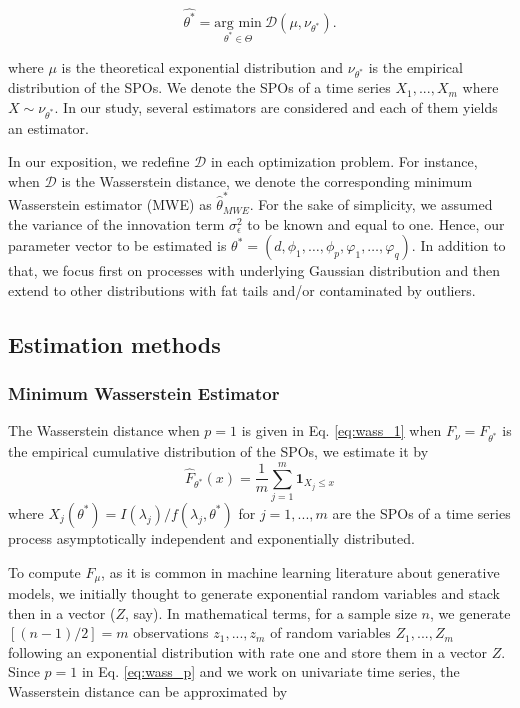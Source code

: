 \documentclass[
  11pt,
]{article}
\begin{document}
\[\hat{\theta^*}=\underset{\theta^* \in \Theta}{\text{arg min}} \ \mathcal{D}\left({\mu}, \nu_{\theta^*}\right) .\]

where \(\mu\) is the theoretical exponential distribution and
\(\nu_{\theta^*}\) is the empirical distribution of the SPOs. We denote
the SPOs of a time series \(X_1, ..., X_m\) where
\(X \sim \nu_{\theta^*}\). In our study, several estimators are
considered and each of them yields an estimator.

In our exposition, we redefine \(\mathcal{D}\) in each optimization
problem. For instance, when \(\mathcal{D}\) is the Wasserstein distance,
we denote the corresponding minimum Wasserstein estimator (MWE) as
\(\hat \theta^*_{MWE}\). For the sake of simplicity, we assumed the
variance of the innovation term \(\sigma^2_\epsilon\) to be known and
equal to one. Hence, our parameter vector to be estimated is
\(\theta^* = (d, \phi_{1}, \ldots, \phi_{p}, \varphi_{1}, \ldots, \varphi_{q}).\)
In addition to that, we focus first on processes with underlying
Gaussian distribution and then extend to other distributions with fat
tails and/or contaminated by outliers.

\hypertarget{estimation-methods}{%
\subsection{Estimation methods}\label{estimation-methods}}

\hypertarget{minimum-wasserstein-estimator}{%
\subsubsection{Minimum Wasserstein
Estimator}\label{minimum-wasserstein-estimator}}

The Wasserstein distance when \(p=1\) is given in Eq. \ref{eq:wass_1}
when \(F_{\nu} = F_{\theta^*}\) is the empirical cumulative distribution
of the SPOs, we estimate it by \[
\hat{F}_{\theta^*}(x)=\frac{1}{m} \sum_{j=1}^{m} \mathbf{1}_{X_{j} \leq x}
\] where
\(X_j(\theta^*) = I(\lambda_j) / f\left(\lambda_{j}, \theta^*\right)\)
for \(j = 1, ..., m\) are the SPOs of a time series process
asymptotically independent and exponentially distributed.

To compute \(F_\mu\), as it is common in machine learning literature
about generative models, we initially thought to generate exponential
random variables and stack then in a vector (\(Z\), say). In
mathematical terms, for a sample size \(n\), we generate
\([(n-1)/2] = m\) observations \(z_1, ..., z_m\) of random variables
\(Z_1, ..., Z_m\) following an exponential distribution with rate one
and store them in a vector \(Z\). Since \(p = 1\) in Eq. \ref{eq:wass_p}
and we work on univariate time series, the Wasserstein distance can be
approximated by
\end{document}
